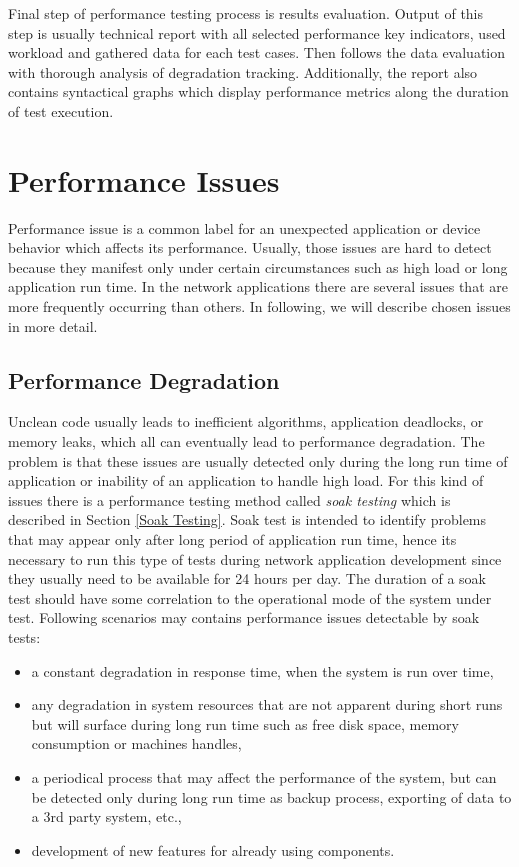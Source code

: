 Final step of performance testing process is results evaluation. Output of this step is usually technical report with all selected performance key indicators, used workload and gathered data for each test cases. Then follows the data evaluation with thorough analysis of degradation tracking. Additionally, the report also contains syntactical graphs which display performance metrics along the duration of test execution.

\section{Performance Issues}
\label{Performance Issues}
Performance issue is a common label for an unexpected application or device behavior which affects its performance. Usually, those issues are hard to detect because they manifest only under certain circumstances such as high load or long application run time. In the network applications there are several issues that are more frequently occurring  than others. In following, we will describe chosen issues in more detail.

\subsection*{Performance Degradation}
\label{Performance Degradation}
Unclean code usually leads to inefficient algorithms, application deadlocks, or memory leaks, which all can eventually lead to performance degradation. The problem is that these issues are usually detected only during the long run time of application or inability of an application to handle high load. For this kind of issues there is a performance testing method called \emph{soak testing} \cite{BUCH:4TYPES, Manzor:APTB} which is described in Section \ref{Soak Testing}. Soak test is intended to identify problems that may appear only after long period of application run time, hence its necessary to run this type of tests during network application development since they usually need to be available for 24 hours per day. The duration of a soak test should have some correlation to the operational mode of the system under test. Following scenarios may contains performance issues detectable by soak tests:

\begin{itemize}
	\setlength\itemsep{0em}
	\item a constant degradation in response time, when the system is run over time,
	\item any degradation in system resources that are not apparent during short runs but will surface during long run time such as free disk space, memory consumption or machines handles,
	\item a periodical process that may affect the performance of the system, but can be detected only during long run time as backup process, exporting of data to a 3rd party system, etc.,
	\item development of new features for already using components.
\end{itemize}


